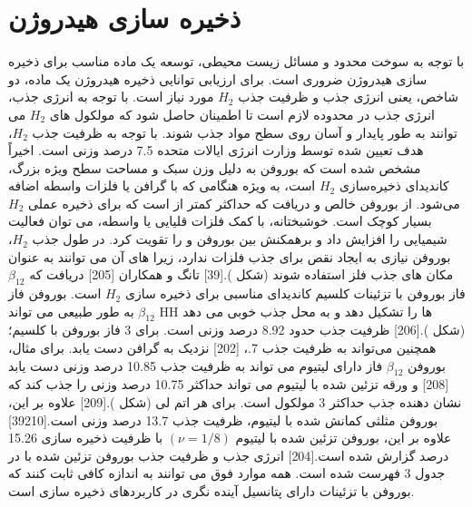 \section{ذخیره سازی هیدروژن}
با توجه به سوخت محدود و مسائل زیست محیطی، توسعه یک ماده مناسب برای ذخیره سازی هیدروژن ضروری است. برای ارزیابی توانایی ذخیره هیدروژن یک ماده، دو شاخص، یعنی انرژی جذب و ظرفیت جذب $H_{2}$ مورد نیاز است. با توجه به انرژی جذب، انرژی جذب در محدوده  لازم است تا اطمینان حاصل شود که مولکول های $H_2$ می توانند به طور پایدار و آسان روی سطح مواد جذب شوند. با توجه به ظرفیت جذب $H_2$، هدف تعیین شده توسط وزارت انرژی ایالات متحده 7.5 درصد وزنی است. اخیراً مشخص شده است که بوروفن به دلیل وزن سبک و مساحت سطح ویژه بزرگ، کاندیدای ذخیره‌سازی $H_2$ است، به ویژه هنگامی که با گرافن یا فلزات واسطه اضافه می‌شود. از بوروفن خالص و دریافت که حداکثر کمتر از  است که برای ذخیره عملی $H_2$ بسیار کوچک است. خوشبختانه، با کمک فلزات قلیایی یا واسطه، می توان فعالیت شیمیایی را افزایش داد و برهمکنش بین بوروفن و  را تقویت کرد. در طول جذب $H_2$، بوروفن نیازی به ایجاد نقص برای جذب فلزات ندارد، زیرا  های آن می توانند به عنوان مکان های جذب فلز استفاده شوند (شکل ).[39] تانگ و همکاران [205] دریافت که $\beta_{12}$ فاز بوروفن با تزئینات کلسیم کاندیدای مناسبی برای ذخیره سازی $H_2$ است. بوروفن فاز $\beta_{12}$ به طور طبیعی می تواند HH ها را تشکیل دهد و به  محل جذب خوبی می دهد (شکل ).[206] ظرفیت جذب  حدود 8.92 درصد وزنی است. برای 3 فاز بوروفن با کلسیم؛ همچنین می‌تواند به ظرفیت جذب  7.، [202] نزدیک به گرافن دست یابد. برای مثال، بوروفن $\beta_{12}$ فاز دارای لیتیوم می تواند به ظرفیت جذب  10.85 درصد وزنی دست یابد [208] و ورقه تزئین شده با لیتیوم می تواند حداکثر 10.75 درصد وزنی  را جذب کند که نشان دهنده جذب حداکثر 3 مولکول  است. برای هر اتم لی (شکل ).[209] علاوه بر این، بوروفن مثلثی کمانش شده با لیتیوم، ظرفیت جذب  13.7 درصد وزنی است.[39210] علاوه بر این، بوروفن تزئین شده با لیتیوم $(\nu= 1/8)$ با ظرفیت ذخیره سازی  15.26 درصد گزارش شده است.[204] انرژی جذب و ظرفیت جذب  بوروفن تزئین شده با  در جدول 3 فهرست شده است. همه موارد فوق می توانند به اندازه کافی ثابت کنند که بوروفن با تزئینات  دارای پتانسیل آینده نگری در کاربردهای ذخیره سازی  است.

